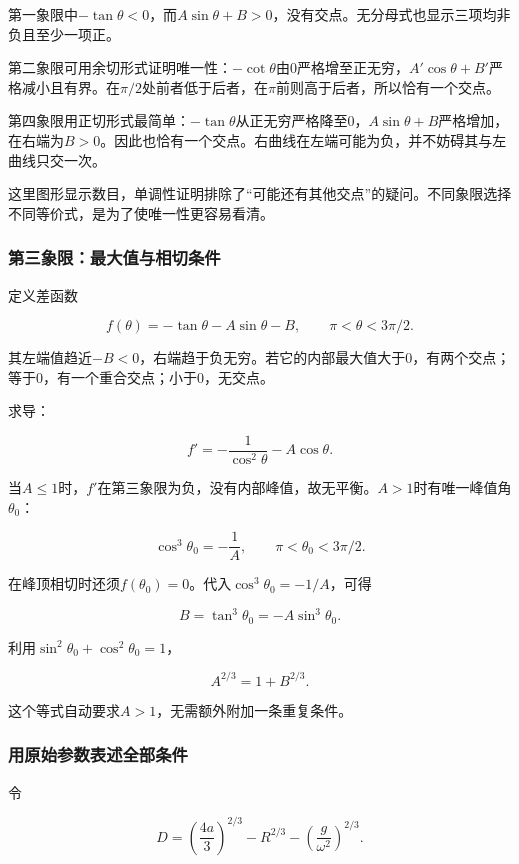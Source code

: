 \documentclass[12pt,a4paper,fontset=fandol]{ctexart}
\begin{document}
第一象限中\(-\tan\theta<0\)，而\(A\sin\theta+B>0\)，没有交点。无分母式也显示三项均非负且至少一项正。

第二象限可用余切形式证明唯一性：\(-\cot\theta\)由0严格增至正无穷，\(A'\cos\theta+B'\)严格减小且有界。在\(\pi/2\)处前者低于后者，在\(\pi\)前则高于后者，所以恰有一个交点。

第四象限用正切形式最简单：\(-\tan\theta\)从正无穷严格降至0，\(A\sin\theta+B\)严格增加，在右端为\(B>0\)。因此也恰有一个交点。右曲线在左端可能为负，并不妨碍其与左曲线只交一次。

这里图形显示数目，单调性证明排除了``可能还有其他交点''的疑问。不同象限选择不同等价式，是为了使唯一性更容易看清。

\subsubsection{第三象限：最大值与相切条件}\label{ux7b2cux4e09ux8c61ux9650ux6700ux5927ux503cux4e0eux76f8ux5207ux6761ux4ef6}

定义差函数

\[
f(\theta)=-\tan\theta-A\sin\theta-B,
\qquad \pi<\theta<3\pi/2.
\]

其左端值趋近\(-B<0\)，右端趋于负无穷。若它的内部最大值大于0，有两个交点；等于0，有一个重合交点；小于0，无交点。

求导：

\[
f'=-\frac1{\cos^2\theta}-A\cos\theta.
\]

当\(A\leq1\)时，\(f'\)在第三象限为负，没有内部峰值，故无平衡。\(A>1\)时有唯一峰值角\(\theta_0\)：

\[
\cos^3\theta_0=-\frac1A,
\qquad \pi<\theta_0<3\pi/2.
\]

在峰顶相切时还须\(f(\theta_0)=0\)。代入\(\cos^3\theta_0=-1/A\)，可得

\[
B=\tan^3\theta_0=-A\sin^3\theta_0.
\]

利用\(\sin^2\theta_0+\cos^2\theta_0=1\)，

\[
\boxed{A^{2/3}=1+B^{2/3}}.
\]

这个等式自动要求\(A>1\)，无需额外附加一条重复条件。

\subsubsection{用原始参数表述全部条件}\label{ux7528ux539fux59cbux53c2ux6570ux8868ux8ff0ux5168ux90e8ux6761ux4ef6}

令

\[
D=\left(\frac{4a}{3}\right)^{2/3}
-R^{2/3}-\left(\frac g{\omega^2}\right)^{2/3}.
\]
\end{document}
